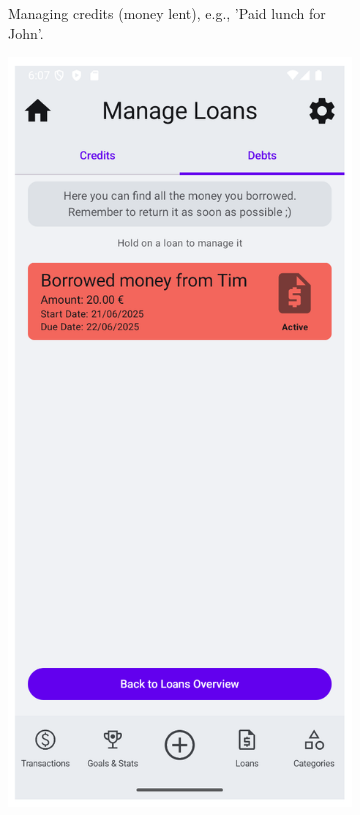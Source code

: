 \documentclass[a4paper,12pt]{article}
\begin{document}
\begin{figure}[H]
\begin{subfigure}[b]{0.23\textwidth}
        \caption{Managing credits (money lent), e.g., 'Paid lunch for John'.}
        \label{fig:manage_credits}
    \end{subfigure}
    \hfill
    \begin{subfigure}[b]{0.23\textwidth}
        \includegraphics[width=\textwidth]{manage_loans_debts.png}

\end{subfigure}
\end{figure}
\end{document}
